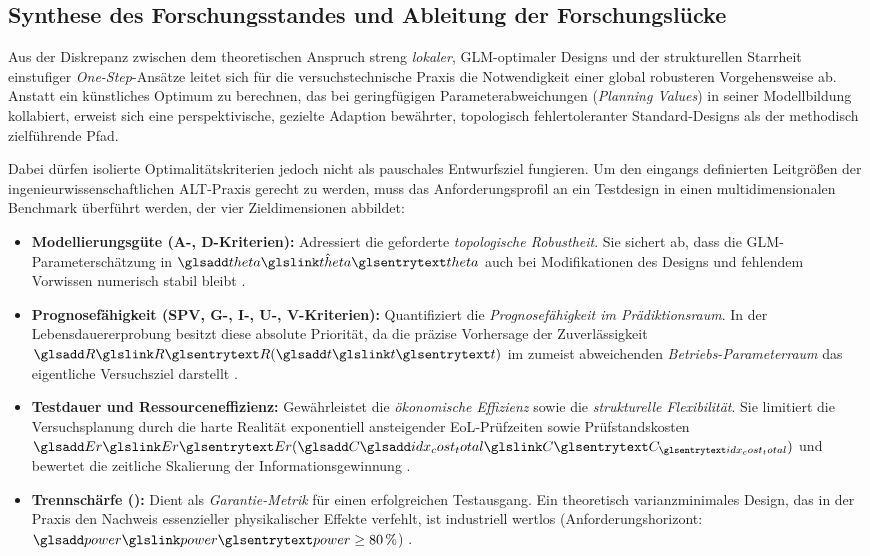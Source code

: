 \subsection{Synthese des Forschungsstandes und Ableitung der Forschungslücke} \label{subsec:synthese_luecke}

Aus der Diskrepanz zwischen dem theoretischen Anspruch streng \textit{lokaler}, \ac{GLM}-optimaler Designs und der strukturellen Starrheit einstufiger \textit{One-Step}-Ansätze leitet sich für die versuchstechnische Praxis die  Notwendigkeit einer global robusteren Vorgehensweise ab.
Anstatt ein künstliches Optimum zu berechnen, das bei geringfügigen Parameterabweichungen (\textit{Planning Values}) in seiner Modellbildung kollabiert, erweist sich eine perspektivische, gezielte Adaption bewährter, topologisch fehlertoleranter Standard-Designs als der methodisch zielführende Pfad.

Dabei dürfen isolierte Optimalitätskriterien jedoch nicht als pauschales Entwurfsziel fungieren.
Um den eingangs definierten Leitgrößen der ingenieurwissenschaftlichen \ac{ALT}-Praxis gerecht zu werden, muss das Anforderungsprofil an ein Testdesign in einen multidimensionalen Benchmark überführt werden, der vier Zieldimensionen abbildet:
\begin{itemize}
    \item \textbf{Modellierungsgüte (A-, D-Kriterien):} Adressiert die geforderte \textit{topologische Robustheit}. Sie sichert ab, dass die \ac{GLM}-Parameterschätzung in $\hat{\sym{theta}}$ auch bei Modifikationen des Designs und fehlendem Vorwissen numerisch stabil bleibt \cite{Montgomery.2020}.
    \item \textbf{Prognosefähigkeit (\ac{SPV}, G-, I-, U-, V-Kriterien):} Quantifiziert die \textit{Prognosefähigkeit im Prädiktionsraum}. In der Lebensdauererprobung besitzt diese absolute Priorität, da die präzise Vorhersage der Zuverlässigkeit $\sym{R}(\sym{t})$ im zumeist abweichenden \textit{Betriebs-Parameterraum} das eigentliche Versuchsziel darstellt \cite{Myers.2016,Rigdon.2022}.
    \item \textbf{Testdauer und Ressourceneffizienz:} Gewährleistet die \textit{ökonomische Effizienz} sowie die \textit{strukturelle Flexibilität}. Sie limitiert die Versuchsplanung durch die harte Realität exponentiell ansteigender \ac{EoL}-Prüfzeiten sowie Prüfstandskosten $\sym{Er}(\symsub{C}{idx_cost_total})$ und bewertet die zeitliche Skalierung der Informationsgewinnung \cite{Arndt.2023b}.
    \item \textbf{Trennschärfe ():} Dient als \textit{Garantie-Metrik} für einen erfolgreichen Testausgang. Ein theoretisch varianzminimales Design, das in der Praxis den Nachweis essenzieller physikalischer Effekte verfehlt, ist industriell wertlos (Anforderungshorizont: $\sym{power} \ge 80\,\%$) \cite{Cohen.1988, Rittmaier.2025}.
\end{itemize}

